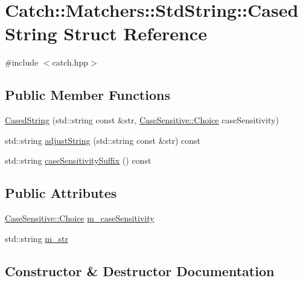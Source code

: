 \hypertarget{struct_catch_1_1_matchers_1_1_std_string_1_1_cased_string}{}\section{Catch\+:\+:Matchers\+:\+:Std\+String\+:\+:Cased\+String Struct Reference}
\label{struct_catch_1_1_matchers_1_1_std_string_1_1_cased_string}


{\ttfamily \#include $<$catch.\+hpp$>$}

\subsection*{Public Member Functions}
\begin{DoxyCompactItemize}
\item 
\mbox{\hyperlink{struct_catch_1_1_matchers_1_1_std_string_1_1_cased_string_aa88bbc5acd2bff22351d8d4b1816b561}{Cased\+String}} (std\+::string const \&str, \mbox{\hyperlink{struct_catch_1_1_case_sensitive_aad49d3aee2d97066642fffa919685c6a}{Case\+Sensitive\+::\+Choice}} case\+Sensitivity)
\item 
std\+::string \mbox{\hyperlink{struct_catch_1_1_matchers_1_1_std_string_1_1_cased_string_a77639b1165c01f424ee0e96f53335010}{adjust\+String}} (std\+::string const \&str) const
\item 
std\+::string \mbox{\hyperlink{struct_catch_1_1_matchers_1_1_std_string_1_1_cased_string_a9759155344d696b2476d764a1d95fcc9}{case\+Sensitivity\+Suffix}} () const
\end{DoxyCompactItemize}
\subsection*{Public Attributes}
\begin{DoxyCompactItemize}
\item 
\mbox{\hyperlink{struct_catch_1_1_case_sensitive_aad49d3aee2d97066642fffa919685c6a}{Case\+Sensitive\+::\+Choice}} \mbox{\hyperlink{struct_catch_1_1_matchers_1_1_std_string_1_1_cased_string_ae1c2864c986941536a6e94cca0528f92}{m\+\_\+case\+Sensitivity}}
\item 
std\+::string \mbox{\hyperlink{struct_catch_1_1_matchers_1_1_std_string_1_1_cased_string_ad05dbc99aba3c3c386d6b856b213f911}{m\+\_\+str}}
\end{DoxyCompactItemize}


\subsection{Constructor \& Destructor Documentation}
\mbox{\label{struct_catch_1_1_matchers_1_1_std_string_1_1_cased_string_aa88bbc5acd2bff22351d8d4b1816b561}} 
